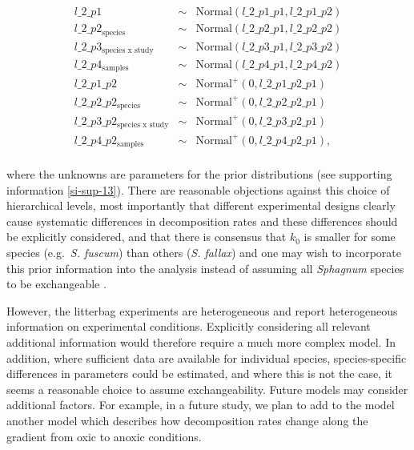 \documentclass[bg, manuscript]{copernicus}
\begin{document}
\begin{equation}
\begin{aligned}
l\_2\_p1 & \sim & \text{Normal}(l\_2\_p1\_p1, l\_2\_p1\_p2)\\
l\_2\_p2_{\text{species}} & \sim & \text{Normal}(l\_2\_p2\_p1, l\_2\_p2\_p2)\\
l\_2\_p3_{\text{species x study}} & \sim & \text{Normal}(l\_2\_p3\_p1, l\_2\_p3\_p2)\\
l\_2\_p4_{\text{samples}} & \sim & \text{Normal}(l\_2\_p4\_p1, l\_2\_p4\_p2)\\
l\_2\_p1\_p2 & \sim & \text{Normal}^+(0, l\_2\_p1\_p2\_p1)\\
l\_2\_p2\_p2_{\text{species}} & \sim & \text{Normal}^+(0, l\_2\_p2\_p2\_p1)\\
l\_2\_p3\_p2_{\text{species x study}} & \sim & \text{Normal}^+(0, l\_2\_p3\_p2\_p1)\\
l\_2\_p4\_p2_{\text{samples}} & \sim & \text{Normal}^+(0, l\_2\_p4\_p2\_p1),\\
\label{eq:leaching-hierarchical-model-l0-2}
\end{aligned}
\end{equation}

where the unknowns are parameters for the prior distributions (see supporting information \ref{si-sup-13}). There are reasonable objections against this choice of hierarchical levels, most importantly that different experimental designs clearly cause systematic differences in decomposition rates and these differences should be explicitly considered, and that there is consensus that \(k_0\) is smaller for some species (e.g.~\emph{S. fuscum}) than others (\emph{S. fallax}) and one may wish to incorporate this prior information into the analysis instead of assuming all \emph{Sphagnum} species to be exchangeable \citep{Gelman.2014}.

However, the litterbag experiments are heterogeneous and report heterogeneous information on experimental conditions. Explicitly considering all relevant additional information would therefore require a much more complex model. In addition, where sufficient data are available for individual species, species-specific differences in parameters could be estimated, and where this is not the case, it seems a reasonable choice to assume exchangeability. Future models may consider additional factors. For example, in a future study, we plan to add to the model another model which describes how decomposition rates change along the gradient from oxic to anoxic conditions.
\end{document}
